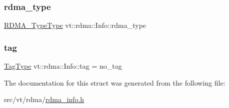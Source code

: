\mbox{\label{structvt_1_1rdma_1_1_info_a123ce7dd75200e49c67ba513802c6e53}} 
\subsubsection{\texorpdfstring{rdma\+\_\+type}{rdma\_type}}
{\footnotesize\ttfamily \hyperlink{namespacevt_1_1rdma_ac848e1d9da43db6294bd06f83e5d3946}{R\+D\+M\+A\+\_\+\+Type\+Type} vt\+::rdma\+::\+Info\+::rdma\+\_\+type}

\mbox{\label{structvt_1_1rdma_1_1_info_a7d19beb6e7a0757aea7d3a16f610b6dd}} 
\subsubsection{\texorpdfstring{tag}{tag}}
{\footnotesize\ttfamily \hyperlink{namespacevt_a84ab281dae04a52a4b243d6bf62d0e52}{Tag\+Type} vt\+::rdma\+::\+Info\+::tag = no\+\_\+tag}



The documentation for this struct was generated from the following file\+:\begin{DoxyCompactItemize}
\item 
src/vt/rdma/\hyperlink{rdma__info_8h}{rdma\+\_\+info.\+h}\end{DoxyCompactItemize}
